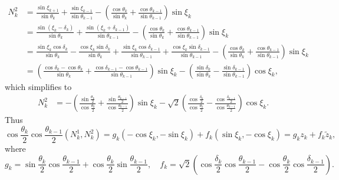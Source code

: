 \documentclass[12pt]{article}
\begin{document}
\begin{equation*}
  \begin{split}
N_{k}^2 
&= 
\frac{\sin \xi_{k+1}}{\sin {\theta_{k}}} 
+  \frac{\sin \xi_{k-1}}{\sin {\theta_{k-1}}} 
- \left(
  \frac{\cos \theta_k}{\sin {\theta_{k}}}
+  \frac{\cos \theta_{k-1} }{\sin {\theta_{k-1}}}
\right)
\sin \xi_{k} \\
& = 
\frac{\sin (\xi_{k}-\delta_k)}{\sin {\theta_{k}}} 
+  \frac{\sin (\xi_{k}+\delta_{k-1})}{\sin {\theta_{k-1}}} 
- \left(
  \frac{\cos \theta_k}{\sin {\theta_{k}}}
+  \frac{\cos \theta_{k-1} }{\sin {\theta_{k-1}}}
\right)
\sin \xi_{k} \\
& = 
\frac{\sin\xi_{k} \cos\delta_k}{\sin {\theta_{k}}} 
-\frac{\cos\xi_{k} \sin\delta_k}{\sin {\theta_{k}}} 
+  \frac{\sin \xi_{k}\cos\delta_{k-1}}{\sin {\theta_{k-1}}} 
+  \frac{\cos \xi_{k}\sin\delta_{k-1}}{\sin {\theta_{k-1}}}
- \left(
  \frac{\cos \theta_k}{\sin {\theta_{k}}}
+  \frac{\cos \theta_{k-1} }{\sin {\theta_{k-1}}}
\right)
\sin \xi_{k} \\
& = 
 \left(
\frac{\cos \delta_{k}-\cos \theta_k}{\sin \theta_k}
+ \frac{\cos \delta_{k-1}-\cos \theta_{k-1}}{\sin \theta_{k-1}}
\right) \sin \xi_k
- \left(
  \frac{\sin \delta_{k}}{\sin \theta_k}
- \frac{\sin \delta_{k-1}}{\sin \theta_{k-1}}
\right) \cos \xi_k ,
\end{split}
\end{equation*}
which simplifies to 
\begin{equation*}
  \begin{split}
N_{k}^2 
& = -\left(
  \frac{\sin  \frac{\theta_k}{2} }{\cos \frac{\theta_k}{2}}
  + \frac{\sin  \frac{\theta_{k-1}}{2}}{\cos \frac{\theta_{k-1}}{2}}
  \right) \sin \xi_k 
  - 
  \sqrt{2}
  \left(
    \frac{\cos \frac{\delta_{k}}{2}}{\cos \frac{\theta_k}{2}}
  - \frac{\cos \frac{\delta_{k-1}}{2}}{\cos \frac{\theta_{k-1}}{2}}
  \right) \cos \xi_k .
\end{split}
\end{equation*}
Thus 
\begin{equation}\label{eq:nk2}
  \cos \frac{\theta_k}{2}
\cos \frac{\theta_{k-1}}{2}
 (N_{k}^1,N_{k}^2) = g_k(-\cos \xi_k, -\sin \xi_k) + f_k  (\sin \xi_k, -\cos \xi_k)
 =  g_k z_k + f_k \tilde{z}_k,
\end{equation}
where 
\begin{equation}\label{eq:gk-fk}
  g_k = 
  {\sin  \frac{\theta_k}{2} }
  {\cos \frac{\theta_{k-1}}{2}}
  + {\cos \frac{\theta_k}{2}}{\sin  \frac{\theta_{k-1}}{2}}
  ,
  \quad
  f_{k} =\sqrt{2}\left(
  {\cos \frac{\delta_{k}}{2}}\cos \frac{\theta_{k-1}}{2}
  -  {\cos \frac{\theta_k}{2}}{\cos \frac{\delta_{k-1}}{2}}
  \right).
\end{equation}
\end{document}
